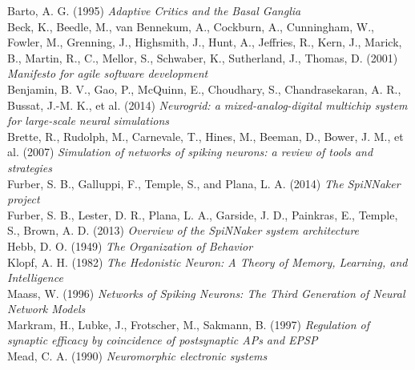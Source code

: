 \documentclass[10pt]{article}
\begin{document}
    Barto, A. G. (1995) \textit{Adaptive Critics and the Basal Ganglia} \\[-3pt]

    \noindent
    Beck, K., Beedle, M., van Bennekum, A., Cockburn, A., Cunningham, W., Fowler, M., Grenning, J., Highsmith, J., Hunt, A., Jeffries, R., Kern, J., Marick, B., Martin, R., C., Mellor, S., Schwaber, K., Sutherland, J., Thomas, D. (2001) \textit{Manifesto for agile software development} \\[-3pt]

    \noindent
    Benjamin, B. V., Gao, P., McQuinn, E., Choudhary, S., Chandrasekaran, A. R., Bussat, J.-M. K., et al. (2014) \textit{ Neurogrid: a mixed-analog-digital multichip system for large-scale neural simulations} \\[-3pt]

    \noindent 
    Brette, R., Rudolph, M., Carnevale, T., Hines, M., Beeman, D., Bower, J. M., et al. (2007) \textit{ Simulation of networks of spiking neurons: a review of tools and strategies} \\[-3pt]

    \noindent    
    Furber, S. B., Galluppi, F., Temple, S., and Plana, L. A. (2014) \textit{The SpiNNaker project} \\[-3pt]
    
    \noindent    
    Furber, S. B., Lester, D. R., Plana, L. A., Garside, J. D., Painkras, E., Temple, S., Brown, A. D. (2013) \textit{Overview of the SpiNNaker system architecture} \\[-3pt]

    \noindent
    Hebb, D. O. (1949) \textit{The Organization of Behavior} \\[-3pt]

    \noindent    
    Klopf, A. H. (1982) \textit{The Hedonistic Neuron: A Theory of Memory, Learning, and Intelligence} \\[-3pt]

    \noindent
    Maass, W. (1996) \textit{Networks of Spiking Neurons: The Third Generation of Neural Network Models} \\[-3pt]

    \noindent
    Markram, H., Lubke, J., Frotscher, M., Sakmann, B. (1997) \textit{Regulation of synaptic efficacy by coincidence of postsynaptic APs and EPSP } \\[-3pt]

    \noindent
    Mead, C. A. (1990) \textit{Neuromorphic electronic systems} \\[-3pt]
\end{document}

